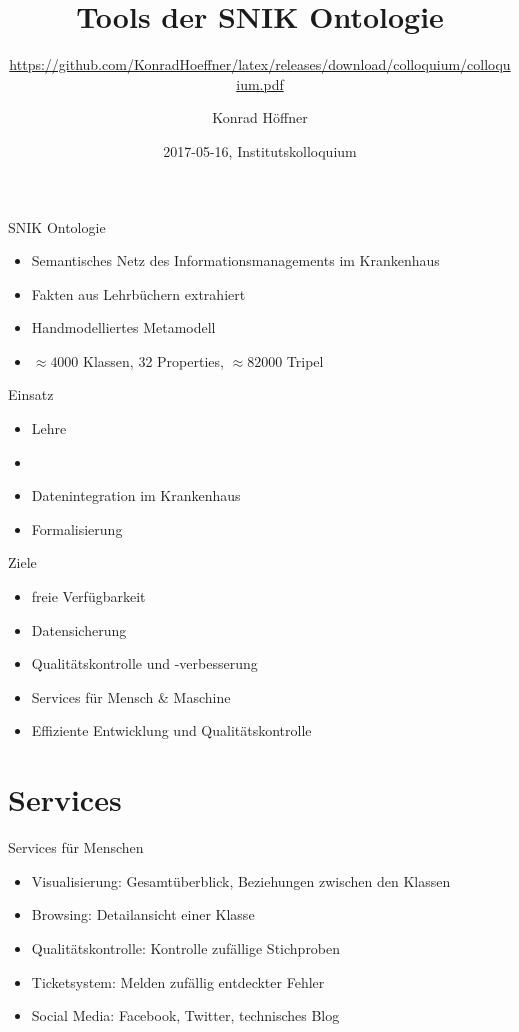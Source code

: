 \documentclass{beamer}
\author{Konrad Höffner}
\date{2017-05-16, Institutskolloquium}
\title{Tools der SNIK Ontologie}
\subtitle{\url{https://github.com/KonradHoeffner/latex/releases/download/colloquium/colloquium.pdf}}
\begin{document}
\begin{frame}
\titlepage
\end{frame}

\begin{frame}{SNIK Ontologie}
\begin{itemize}
\item Semantisches Netz des Informationsmanagements im Krankenhaus
\item Fakten aus Lehrbüchern extrahiert
\item Handmodelliertes Metamodell
\item $\approx \num{4000}$ Klassen, 32 Properties, $\approx \num{82000}$ Tripel
\end{itemize}
\end{frame}
\begin{frame}{Einsatz}
\begin{itemize}
\item Lehre%
\item 
\item Datenintegration im Krankenhaus%
\item Formalisierung  
\end{itemize}
\end{frame}
\begin{frame}{Ziele}
\begin{itemize}
\item freie Verfügbarkeit
\item Datensicherung
\item Qualitätskontrolle und -verbesserung
\pause
\item Services für Mensch \& Maschine
\item Effiziente Entwicklung und Qualitätskontrolle
\end{itemize}
\end{frame}

\section{Services}
\begin{frame}{Services für Menschen}
\begin{itemize}
\item Visualisierung: Gesamtüberblick, Beziehungen zwischen den Klassen
\item Browsing: Detailansicht einer Klasse
\item Qualitätskontrolle: Kontrolle zufällige Stichproben
\item Ticketsystem: Melden zufällig entdeckter Fehler 
\item Social Media: Facebook, Twitter, technisches Blog
\end{itemize}
\end{frame}
\end{document}
